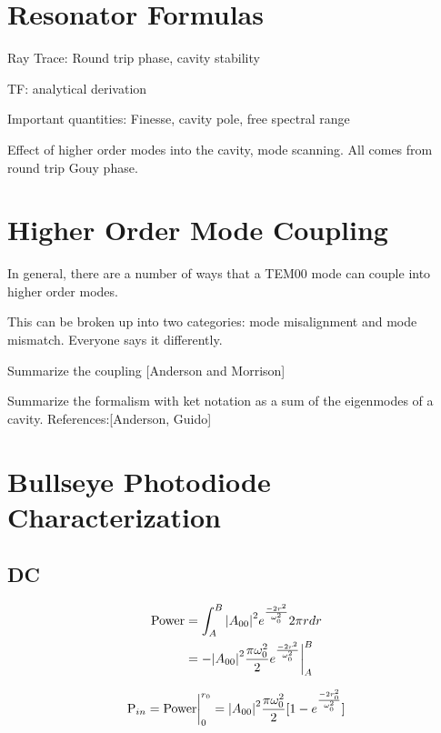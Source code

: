 \documentclass[oneside]{book}
\begin{document}
\begin{appendices}

	\chapter{Resonator Formulas}
	
	
	Ray Trace: Round trip phase, cavity stability
	
	TF: analytical derivation
	
	Important quantities: Finesse, cavity pole, free spectral range
	
	Effect of higher order modes into the cavity, mode scanning. All comes from round trip Gouy phase.
	
	
	\chapter{Higher Order Mode Coupling}
	In general, there are a number of ways that a TEM00 mode can couple into higher order modes.  
	
	This can be broken up into two categories: mode misalignment and mode mismatch.  Everyone says it differently.
	
	Summarize the coupling [Anderson and Morrison]
	
	Summarize the formalism with ket notation as a sum of the eigenmodes of a cavity.
	References:[Anderson, Guido]
	
	
	\chapter{Bullseye Photodiode Characterization}
	
	\section{DC}
	\begin{equation}
	\begin{split}
	\text{Power} &= \int_{A}^{B} \abs{A_{00}}^2e^{\frac{-2r^2}{\omega_{0}^2}} 2\pi r dr\\
			&= -\abs{A_{00}}^2 \frac{\pi \omega_{0}^2}{2} e^{\frac{-2r^2}{\omega_{0}^2}} \biggr\rvert_A^B
	\end{split}
	\end{equation}
	
	\begin{equation}
	\text{P}_{in} = \text{Power} \biggr\rvert_0^{r_0} = \abs{A_{00}}^2 \frac{\pi \omega_{0}^2}{2} [1 - e^{\frac{-2r_0^2}{\omega_{0}^2}}]
	\end{equation}
	

\end{appendices}
\end{document}
